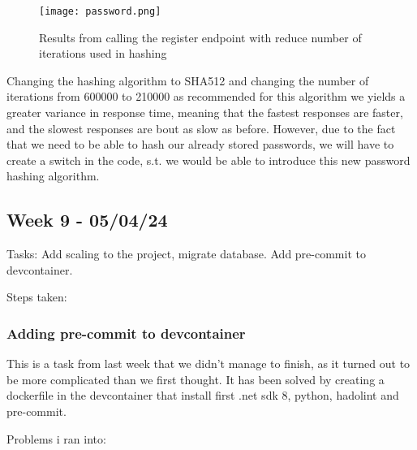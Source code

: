 \begin{figure}[H]
\centering
\texttt{[image: password.png]}
\caption{Results from calling the register endpoint with reduce number of iterations used in hashing}
\end{figure}

Changing the hashing algorithm to SHA512 and changing the number of iterations from 600000 to 210000 as recommended for this algorithm we yields a greater variance in response time, meaning that the fastest responses are faster, and the slowest responses are bout as slow as before. However, due to the fact that we need to be able to hash our already stored passwords, we will have to create a switch in the code, s.t. we would be able to introduce this new password hashing algorithm.

\subsection{Week 9 - 05/04/24}
\label{log:week9}

Tasks: Add scaling to the project, migrate database. Add pre-commit to
devcontainer.

Steps taken:

\subsubsection{Adding pre-commit to devcontainer}
\label{log:adding-pre-commit-to-devcontainer}

This is a task from last week that we didn't manage to finish, as it turned out to be more complicated than we first thought. It has been solved by creating a dockerfile in the devcontainer that install first .net sdk 8, python, hadolint and pre-commit.

Problems i ran into:

